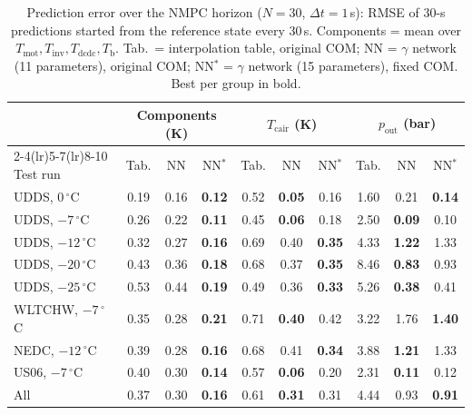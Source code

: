 \begin{table}[t]
\centering
\caption{Prediction error over the NMPC horizon ($N = 30$, $\Delta t = 1$\,s): RMSE of 30-s predictions started from the reference state every 30\,s. Components = mean over $T_{\mathrm{mot}}, T_{\mathrm{inv}}, T_{\mathrm{dcdc}}, T_{\mathrm{b}}$. Tab.\ = interpolation table, original COM; NN = $\gamma$ network (11 parameters), original COM; NN$^{\ast}$ = $\gamma$ network (15 parameters), fixed COM. Best per group in bold.}
\label{tab:horizon30}
\begin{tabular}{l ccc ccc ccc}
\toprule
 & \multicolumn{3}{c}{Components (K)} & \multicolumn{3}{c}{$T_{\mathrm{cair}}$ (K)} & \multicolumn{3}{c}{$p_{\mathrm{out}}$ (bar)} \\
\cmidrule(lr){2-4}\cmidrule(lr){5-7}\cmidrule(lr){8-10}
Test run & Tab. & NN & NN$^{\ast}$ & Tab. & NN & NN$^{\ast}$ & Tab. & NN & NN$^{\ast}$ \\
\midrule
UDDS, $0\,^{\circ}$C & 0.19 & 0.16 & \textbf{0.12} & 0.52 & \textbf{0.05} & 0.16 & 1.60 & 0.21 & \textbf{0.14} \\
UDDS, $-7\,^{\circ}$C & 0.26 & 0.22 & \textbf{0.11} & 0.45 & \textbf{0.06} & 0.18 & 2.50 & \textbf{0.09} & 0.10 \\
UDDS, $-12\,^{\circ}$C & 0.32 & 0.27 & \textbf{0.16} & 0.69 & 0.40 & \textbf{0.35} & 4.33 & \textbf{1.22} & 1.33 \\
UDDS, $-20\,^{\circ}$C & 0.43 & 0.36 & \textbf{0.18} & 0.68 & 0.37 & \textbf{0.35} & 8.46 & \textbf{0.83} & 0.93 \\
UDDS, $-25\,^{\circ}$C & 0.53 & 0.44 & \textbf{0.19} & 0.49 & 0.36 & \textbf{0.33} & 5.26 & \textbf{0.38} & 0.41 \\
WLTCHW, $-7\,^{\circ}$C & 0.35 & 0.28 & \textbf{0.21} & 0.71 & \textbf{0.40} & 0.42 & 3.22 & 1.76 & \textbf{1.40} \\
NEDC, $-12\,^{\circ}$C & 0.39 & 0.28 & \textbf{0.16} & 0.68 & 0.41 & \textbf{0.34} & 3.88 & \textbf{1.21} & 1.33 \\
US06, $-7\,^{\circ}$C & 0.40 & 0.30 & \textbf{0.14} & 0.57 & \textbf{0.06} & 0.20 & 2.31 & \textbf{0.11} & 0.12 \\
\midrule
All & 0.37 & 0.30 & \textbf{0.16} & 0.61 & \textbf{0.31} & 0.31 & 4.44 & 0.93 & \textbf{0.91} \\
\bottomrule
\end{tabular}
\end{table}
